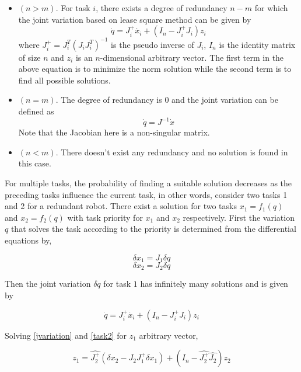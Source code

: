 \begin{itemize}
    \item $(n > m)$. For task $i$, there exists a degree of redundancy $n-m$ for which the joint variation based on lease square method can be given by $$\dot{q} = J_i^+\dot{x_i} + (I_n - J_i^+J_i)z_i$$
    where $J_i^+ = J_i^T(J_iJ_i^T)^{-1}$ is the pseudo inverse of $J_i$, $I_n$ is the identity matrix of size $n$ and $z_i$ is an $n$-dimensional arbitrary vector. The first term in the above equation
    is to minimize the norm solution while the second term is to find all possible solutions. 

    \item $(n = m)$. The degree of redundancy is $0$ and the joint variation can be defined as $$\dot{q} = J^{-1} \dot{x}$$ Note that the Jacobian here is a non-singular matrix.
    \item $(n < m)$. There doesn't exist any redundancy and no solution is found in this case.
\end{itemize}

For multiple tasks, the probability of finding a suitable solution decreases as the preceding tasks influence the current task, in other words, consider two tasks 1 and 2 for a redundant robot. There 
exist a solution for two tasks $x_1 = f_1(q)$ and $x_2 = f_2(q)$ with task priority for $x_1$ and $x_2$ respectively. First the variation $q$ that solves the task according to the priority is 
determined from the differential equations by,

\begin{equation}
    \delta x_1 = J_1\delta q 
    \label{task1}
\end{equation}
\begin{equation}
    \delta x_2 = J_2\delta q 
    \label{task2}
\end{equation}

Then the joint variation $\delta q$ for task $1$ has infinitely many solutions and is given by

\begin{equation}
        \dot{q} = J_i^+\dot{x_i} + (I_n - J_i^+J_i)z_i 
        \label{jvariation}
\end{equation}

Solving \ref{jvariation} and \ref{task2} for $z_1$ arbitrary vector,

\begin{equation}
    z_1 = \hat{J_2^+}(\delta x_2 - J_2J_1^+ \delta x_1) + (I_n - \hat{J_2^+}\hat{J_2})z_2
\end{equation}

